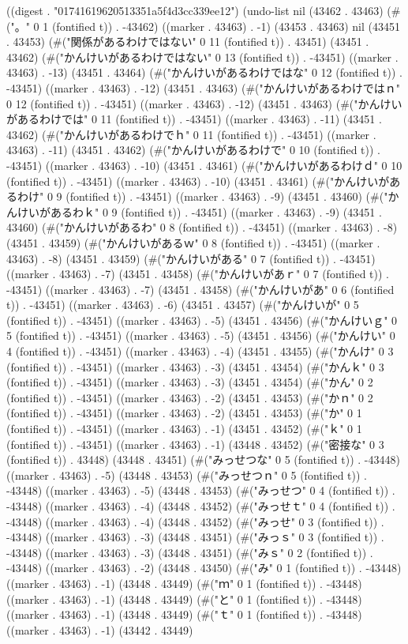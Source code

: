 
((digest . "01741619620513351a5f4d3cc339ee12") (undo-list nil (43462 . 43463) (#("。" 0 1 (fontified t)) . -43462) ((marker . 43463) . -1) (43453 . 43463) nil (43451 . 43453) (#("関係があるわけではない" 0 11 (fontified t)) . 43451) (43451 . 43462) (#("かんけいがあるわけではない" 0 13 (fontified t)) . -43451) ((marker . 43463) . -13) (43451 . 43464) (#("かんけいがあるわけではな" 0 12 (fontified t)) . -43451) ((marker . 43463) . -12) (43451 . 43463) (#("かんけいがあるわけではｎ" 0 12 (fontified t)) . -43451) ((marker . 43463) . -12) (43451 . 43463) (#("かんけいがあるわけでは" 0 11 (fontified t)) . -43451) ((marker . 43463) . -11) (43451 . 43462) (#("かんけいがあるわけでｈ" 0 11 (fontified t)) . -43451) ((marker . 43463) . -11) (43451 . 43462) (#("かんけいがあるわけで" 0 10 (fontified t)) . -43451) ((marker . 43463) . -10) (43451 . 43461) (#("かんけいがあるわけｄ" 0 10 (fontified t)) . -43451) ((marker . 43463) . -10) (43451 . 43461) (#("かんけいがあるわけ" 0 9 (fontified t)) . -43451) ((marker . 43463) . -9) (43451 . 43460) (#("かんけいがあるわｋ" 0 9 (fontified t)) . -43451) ((marker . 43463) . -9) (43451 . 43460) (#("かんけいがあるわ" 0 8 (fontified t)) . -43451) ((marker . 43463) . -8) (43451 . 43459) (#("かんけいがあるｗ" 0 8 (fontified t)) . -43451) ((marker . 43463) . -8) (43451 . 43459) (#("かんけいがある" 0 7 (fontified t)) . -43451) ((marker . 43463) . -7) (43451 . 43458) (#("かんけいがあｒ" 0 7 (fontified t)) . -43451) ((marker . 43463) . -7) (43451 . 43458) (#("かんけいがあ" 0 6 (fontified t)) . -43451) ((marker . 43463) . -6) (43451 . 43457) (#("かんけいが" 0 5 (fontified t)) . -43451) ((marker . 43463) . -5) (43451 . 43456) (#("かんけいｇ" 0 5 (fontified t)) . -43451) ((marker . 43463) . -5) (43451 . 43456) (#("かんけい" 0 4 (fontified t)) . -43451) ((marker . 43463) . -4) (43451 . 43455) (#("かんけ" 0 3 (fontified t)) . -43451) ((marker . 43463) . -3) (43451 . 43454) (#("かんｋ" 0 3 (fontified t)) . -43451) ((marker . 43463) . -3) (43451 . 43454) (#("かん" 0 2 (fontified t)) . -43451) ((marker . 43463) . -2) (43451 . 43453) (#("かｎ" 0 2 (fontified t)) . -43451) ((marker . 43463) . -2) (43451 . 43453) (#("か" 0 1 (fontified t)) . -43451) ((marker . 43463) . -1) (43451 . 43452) (#("ｋ" 0 1 (fontified t)) . -43451) ((marker . 43463) . -1) (43448 . 43452) (#("密接な" 0 3 (fontified t)) . 43448) (43448 . 43451) (#("みっせつな" 0 5 (fontified t)) . -43448) ((marker . 43463) . -5) (43448 . 43453) (#("みっせつｎ" 0 5 (fontified t)) . -43448) ((marker . 43463) . -5) (43448 . 43453) (#("みっせつ" 0 4 (fontified t)) . -43448) ((marker . 43463) . -4) (43448 . 43452) (#("みっせｔ" 0 4 (fontified t)) . -43448) ((marker . 43463) . -4) (43448 . 43452) (#("みっせ" 0 3 (fontified t)) . -43448) ((marker . 43463) . -3) (43448 . 43451) (#("みっｓ" 0 3 (fontified t)) . -43448) ((marker . 43463) . -3) (43448 . 43451) (#("みｓ" 0 2 (fontified t)) . -43448) ((marker . 43463) . -2) (43448 . 43450) (#("み" 0 1 (fontified t)) . -43448) ((marker . 43463) . -1) (43448 . 43449) (#("ｍ" 0 1 (fontified t)) . -43448) ((marker . 43463) . -1) (43448 . 43449) (#("と" 0 1 (fontified t)) . -43448) ((marker . 43463) . -1) (43448 . 43449) (#("ｔ" 0 1 (fontified t)) . -43448) ((marker . 43463) . -1) (43442 . 43449) 